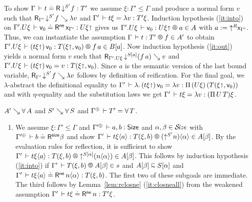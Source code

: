\documentclass[acmsmall,screen]{acmart}\settopmatter{}
\makeatletter
\newenvironment{proof*}[1][\proofname]{\par
  \normalfont \topsep6\p@\@plus6\p@\relax
  \trivlist
  \item[\@proofindent\hskip\labelsep
        {\@proofnamefont #1\@addpunct{.}}]\ignorespaces
}{%
  \endtrivlist\@endpefalse
}
\makeatother
\begin{document}
{\begin{proof*}
\begin{caselist}
\begin{enumerate}
To show $\Gamma \,\vdash t \doteq \mathsf{R}\,\mathord{\downarrow^{S'}} f : {T'}$
we assume $\xi : \Gamma' \leq \Gamma$ and produce a normal form $v$
such that $\mathsf{R}_{\Gamma'} \, \mathord{\downarrow^{S'}} f \searrow \lambda v$ and
$\Gamma' \,\vdash t\xi = \lambda v : T'\xi$.
Induction hypothesis (\ref{it:into}) on
$\Gamma'.{U\xi} \,\vdash \mathsf{v}_{0} \doteq \mathsf{R}^{\mathsf{ne}}\, \mathsf{x}_{\Gamma'} : U\xi\mathord{\shortuparrow}$
gives us $\LR {\cext{\Gamma'}{U\xi}} {\ind 0} {U\xi\slift} a A$
with $a := \mathord{\uparrow^{R}} {\mathsf{x}_{\Gamma'}}$.
Thus, we can instantiate the assumption $\LR \Gamma t {T'} f {A'}$
to obtain
$\LR {\cext{\Gamma'}{U\xi}} {(t\xi\slift)\,\ind 0} {T(\xi\slift,\ind 0)} {f\,a} {B[a]}$.
Now induction hypothesis (\ref{it:out}) yields a normal form $v$ such that
$\mathsf{R}_{\Gamma'.{U\xi}} \, \mathord{\downarrow^{S[a]}} (f\,a) \searrow v$
and
$\Gamma'.{U\xi} \,\vdash (t\xi\mathord{\shortuparrow})\,\mathsf{v}_{0} = v : T(\xi\mathord{\shortuparrow},\mathsf{v}_{0})$.
Since $a$ is the semantic version of the last bound variable,
$\mathsf{R}_{\Gamma'} \, \mathord{\downarrow^{S'}} f \searrow \lambda v$ follows by definition of reification.
For the final goal, we $\lambda$-abstract the definitional equality to
$\Gamma' \,\vdash \lambda.\, (t\xi\mathord{\shortuparrow})\,\mathsf{v}_{0} = \lambda v : \Pi\,(U\xi)\, {(T(\xi\mathord{\shortuparrow},\mathsf{v}_{0}))}$
and with $\eta$-equality and the substitution laws we get
$\Gamma' \,\vdash t\xi = \lambda v : (\Pi\,U\, T)\xi$.
\end{enumerate}

\nextcase $A' \searrow \forall\, A$ and $S' \searrow \forall\, S$ and
$\resurrect\Gamma \der T' = \forallT T$.

\begin{enumerate}

\item %
We assume $\xi : \Gamma' \leq \Gamma$ and
$\resurrect{\Gamma'} \der a, b : \Size$ and $\alpha,\beta \in \mathcal{S}\!\mathit{ize}$ with
$\LRSize {\resurrect{\Gamma'}} b \beta$ and show
$\LR {\Gamma'} {t\xi\ann a} {T(\xi,b)} {(\up {S'} n) \ann \alpha} {A[\beta]}$.
By the evaluation rules for reflection, it is sufficient to show
$\LR {\Gamma'} {t\xi\ann a} {T(\xi,b)} {\up {S[\alpha]} (n \ann \alpha)} {A[\beta]}$.
This follows by induction hypothesis (\ref{it:into}) if
$\LRTS {\Gamma'} {T(\xi,b)} {A[\beta]} s$ and $A[\beta] \shape S[\alpha]$ and
$\Gamma' \,\vdash t\xi\langle a\rangle \doteq \mathsf{R}^{\mathsf{ne}}\, n \langle\alpha\rangle : T(\xi,b)$.
The first two of these subgoals are immediate.
The third follows by Lemma~\ref{lem:rclosne} (\ref{it:closneall}) from the
weakened assumption $\Gamma' \,\vdash t\xi \doteq \mathsf{R}^{\mathsf{ne}}\, n : T'\xi$.
%


\end{enumerate}
\end{caselist}
\end{proof*}}
\end{document}
